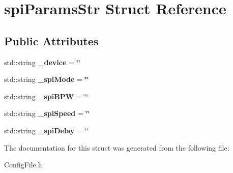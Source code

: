 \hypertarget{structspiParamsStr}{\section{spi\-Params\-Str Struct Reference}
\label{structspiParamsStr}
}
\subsection*{Public Attributes}
\begin{DoxyCompactItemize}
\item 
\hypertarget{structspiParamsStr_a9032047f10cab29967465daf89a0e6c5}{std\-::string {\bfseries \-\_\-device} = \char`\"{}\char`\"{}}\label{structspiParamsStr_a9032047f10cab29967465daf89a0e6c5}

\item 
\hypertarget{structspiParamsStr_a2d7123c02c09f548d9df499dde79c7e1}{std\-::string {\bfseries \-\_\-spi\-Mode} = \char`\"{}\char`\"{}}\label{structspiParamsStr_a2d7123c02c09f548d9df499dde79c7e1}

\item 
\hypertarget{structspiParamsStr_a91a52ca6f255d0f450c104f73b7e94a9}{std\-::string {\bfseries \-\_\-spi\-B\-P\-W} = \char`\"{}\char`\"{}}\label{structspiParamsStr_a91a52ca6f255d0f450c104f73b7e94a9}

\item 
\hypertarget{structspiParamsStr_ad69d2f6544326c2bd3ea9130fb11baec}{std\-::string {\bfseries \-\_\-spi\-Speed} = \char`\"{}\char`\"{}}\label{structspiParamsStr_ad69d2f6544326c2bd3ea9130fb11baec}

\item 
\hypertarget{structspiParamsStr_a50192a5701a61ca8a1c8fc26d450e27b}{std\-::string {\bfseries \-\_\-spi\-Delay} = \char`\"{}\char`\"{}}\label{structspiParamsStr_a50192a5701a61ca8a1c8fc26d450e27b}

\end{DoxyCompactItemize}


The documentation for this struct was generated from the following file\-:\begin{DoxyCompactItemize}
\item 
Config\-File.\-h\end{DoxyCompactItemize}
